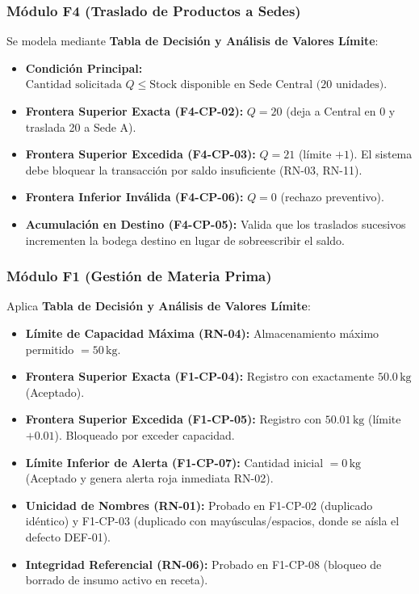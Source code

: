 \documentclass[11pt,a4paper]{article}
\begin{document}
\subsubsection{Módulo F4 (Traslado de Productos a Sedes)}
Se modela mediante \textbf{Tabla de Decisión y Análisis de Valores Límite}:
\begin{itemize}[noitemsep]
    \item \textbf{Condición Principal:} $\text{Cantidad solicitada } Q \le \text{Stock disponible en Sede Central (20 unidades)}$.
    \item \textbf{Frontera Superior Exacta (F4-CP-02):} $Q = 20$ (deja a Central en 0 y traslada 20 a Sede A).
    \item \textbf{Frontera Superior Excedida (F4-CP-03):} $Q = 21$ (límite $+ 1$). El sistema debe bloquear la transacción por saldo insuficiente (RN-03, RN-11).
    \item \textbf{Frontera Inferior Inválida (F4-CP-06):} $Q = 0$ (rechazo preventivo).
    \item \textbf{Acumulación en Destino (F4-CP-05):} Valida que los traslados sucesivos incrementen la bodega destino en lugar de sobreescribir el saldo.
\end{itemize}

\subsubsection{Módulo F1 (Gestión de Materia Prima)}
Aplica \textbf{Tabla de Decisión y Análisis de Valores Límite}:
\begin{itemize}[noitemsep]
    \item \textbf{Límite de Capacidad Máxima (RN-04):} Almacenamiento máximo permitido $= 50\,\text{kg}$.
    \item \textbf{Frontera Superior Exacta (F1-CP-04):} Registro con exactamente $50.0\,\text{kg}$ (Aceptado).
    \item \textbf{Frontera Superior Excedida (F1-CP-05):} Registro con $50.01\,\text{kg}$ (límite $+ 0.01$). Bloqueado por exceder capacidad.
    \item \textbf{Límite Inferior de Alerta (F1-CP-07):} Cantidad inicial $= 0\,\text{kg}$ (Aceptado y genera alerta roja inmediata RN-02).
    \item \textbf{Unicidad de Nombres (RN-01):} Probado en F1-CP-02 (duplicado idéntico) y F1-CP-03 (duplicado con mayúsculas/espacios, donde se aísla el defecto DEF-01).
    \item \textbf{Integridad Referencial (RN-06):} Probado en F1-CP-08 (bloqueo de borrado de insumo activo en receta).
\end{itemize}
\end{document}
